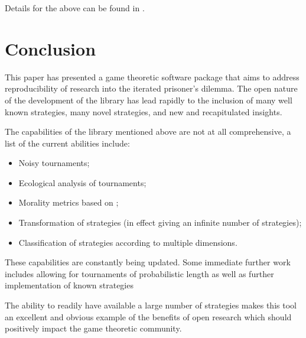 \documentclass{article}
\begin{document}
Details for the above can be found in \cite{Harper2015}.

\section{Conclusion}\label{sec:conclusion}

This paper has presented a game theoretic software package that aims to address
reproducibility of research into the iterated prisoner's dilemma. The open
nature of the development of the library has lead rapidly to the inclusion of
many well known strategies, many novel strategies, and new and recapitulated
insights.

The capabilities of the library mentioned above are not at all comprehensive, a
list of the current abilities include:

\begin{itemize}
    \item Noisy tournaments;
    \item Ecological analysis of tournaments;
    \item Morality metrics based on \cite{Singer-Clark2014};
    \item Transformation of strategies (in effect giving an infinite number of
        strategies);
    \item Classification of strategies according to multiple dimensions.
\end{itemize}

These capabilities are constantly being updated. Some immediate further work
includes allowing for tournaments of probabilistic length as well as further
implementation of known strategies

The ability to readily have available a large number of strategies makes this
tool an excellent and obvious example of the benefits of open research which
should positively impact the game theoretic community.

\printbibliography
\end{document}
